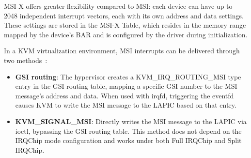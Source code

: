 \begin{ZhChapter}
MSI-X offers greater flexibility compared to MSI: each device can have up to 2048 independent interrupt vectors, each with its own address and data settings. These settings are stored in the MSI-X Table, which resides in the memory range mapped by the device's BAR and is configured by the driver during initialization.

In a KVM virtualization environment, MSI interrupts can be delivered through two methods~\cite{KVMAPI}:

\begin{itemize}
    \item \textbf{GSI routing}: The hypervisor creates a KVM\_IRQ\_ROUTING\_MSI type entry in the GSI routing table, mapping a specific GSI number to the MSI message's address and data. When used with irqfd, triggering the eventfd causes KVM to write the MSI message to the LAPIC based on that entry.
    \item \textbf{KVM\_SIGNAL\_MSI}: Directly writes the MSI message to the LAPIC via ioctl, bypassing the GSI routing table. This method does not depend on the IRQChip mode configuration and works under both Full IRQChip and Split IRQChip.
\end{itemize}

\end{ZhChapter}
